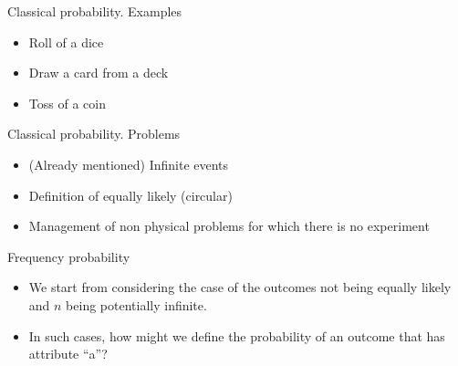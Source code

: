 \documentclass{beamer}
\begin{document}


\begin{frame}
{\centerline{Classical probability. Examples }}
\begin{itemize}
\item Roll of a dice
\item Draw a card from a deck
\item Toss of a coin
\end{itemize}
\end{frame}


\begin{frame}
{\centerline{Classical probability. Problems }}
\begin{itemize}
\item (Already mentioned) Infinite events\\
\item Definition of equally likely (circular)\\
\item Management of non physical problems for which there is no experiment
\end{itemize}
\end{frame}




\begin{frame}
{\centerline{Frequency probability }}


\begin{itemize}
\item We start from considering the case of the outcomes not being equally likely and $n$ being potentially infinite.\\
\item In such cases, how might we define the probability of an outcome that has attribute ``a''?
\end{itemize}
 

\end{frame}
\end{document}
